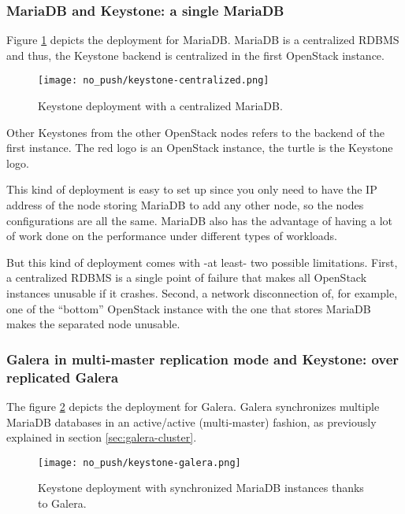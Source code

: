 \subsubsection{MariaDB and Keystone: a single MariaDB}


Figure \ref{fig:key-dep-centralized} depicts the deployment for MariaDB. MariaDB is a centralized RDBMS and thus, the Keystone backend is centralized in the first OpenStack instance.

\begin{figure}
  \begin{center}
    \texttt{[image: no\_push/keystone-centralized.png]}
  \end{center}
  \vspace{-20pt}
  \caption{Keystone deployment with a centralized MariaDB.}
  \vspace{-15pt}
  \label{fig:key-dep-centralized}
\end{figure}

 Other Keystones from the other OpenStack nodes refers to the backend of the first instance. The red logo is an OpenStack instance, the turtle is the Keystone logo.

This kind of deployment is easy to set up since you only need to have the IP address of the node storing MariaDB to add any other node, so the nodes configurations are all the same. MariaDB also has the advantage of having a lot of work done on the performance under different types of workloads.

But this kind of deployment comes with -at least- two possible limitations. First, a centralized RDBMS is a single point of failure that makes all OpenStack instances unusable if it crashes. Second, a network disconnection of, for example, one of the ``bottom'' OpenStack instance with the one that stores MariaDB makes the separated node unusable.



\subsubsection{Galera in multi-master replication mode and Keystone: over replicated Galera}
The figure \ref{fig:key-dep-galera} depicts the deployment for Galera. Galera synchronizes multiple MariaDB databases in an active/active (multi-master) fashion, as previously explained in section \ref{sec:galera-cluster}.

\begin{figure}[h]
  \vspace{-10pt}
  \begin{center}
    \texttt{[image: no\_push/keystone-galera.png]}
  \end{center}
  \vspace{-20pt}
  \caption{Keystone deployment with synchronized MariaDB instances thanks to Galera.}
  \vspace{-12pt}
  \label{fig:key-dep-galera}
\end{figure}

